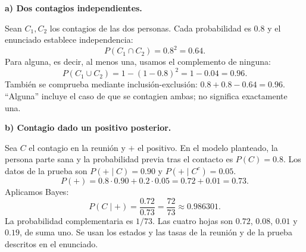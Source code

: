 \textbf{a) Dos contagios independientes.}\par\nopagebreak[4]
Sean $C_1,C_2$ los contagios de las dos personas. Cada probabilidad es $0.8$ y el enunciado establece independencia:
\[
\boxed{P(C_1\cap C_2)=0.8^2=0.64.}
\]
Para alguna, es decir, al menos una, usamos el complemento de ninguna:
\[
\boxed{P(C_1\cup C_2)=1-(1-0.8)^2=1-0.04=0.96.}
\]
También se comprueba mediante inclusión-exclusión: $0.8+0.8-0.64=0.96$. ``Alguna'' incluye el caso de que se contagien ambas; no significa exactamente una.

\textbf{b) Contagio dado un positivo posterior.}\par\nopagebreak[4]
Sea $C$ el contagio en la reunión y $+$ el positivo. En el modelo planteado, la persona parte sana y la probabilidad previa tras el contacto es $P(C)=0.8$. Los datos de la prueba son $P(+\mid C)=0.90$ y $P(+\mid C^c)=0.05$.
\[
P(+)=0.8\cdot0.90+0.2\cdot0.05=0.72+0.01=0.73.
\]
Aplicamos Bayes:
\[
\boxed{P(C\mid+)=\frac{0.72}{0.73}=\frac{72}{73}\approx0.986301.}
\]
La probabilidad complementaria es $1/73$. Las cuatro hojas son $0.72$, $0.08$, $0.01$ y $0.19$, de suma uno. Se usan los estados y las tasas de la reunión y de la prueba descritos en el enunciado.
